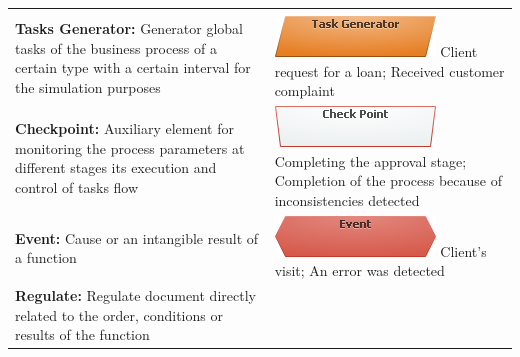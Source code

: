 \documentclass[]{book}
\begin{document}
\begin{longtable}[]{@{}ll@{}}
\begin{minipage}[t]{0.48\columnwidth}
\end{minipage}\tabularnewline
\begin{minipage}[t]{0.46\columnwidth}\raggedright
\textbf{Tasks Generator:} Generator global tasks of the business process of a certain type with a certain interval for the simulation purposes\strut
\end{minipage} & \begin{minipage}[t]{0.48\columnwidth}\raggedright
\includegraphics{images/generator.png} \newline Client request for a loan; Received customer complaint\strut
\end{minipage}\tabularnewline
\begin{minipage}[t]{0.46\columnwidth}\raggedright
\textbf{Checkpoint:} Auxiliary element for monitoring the process parameters at different stages its execution and control of tasks flow\strut
\end{minipage} & \begin{minipage}[t]{0.48\columnwidth}\raggedright
\includegraphics{images/checkpoint.png} \newline Completing the approval stage; Completion of the process because of inconsistencies detected\strut
\end{minipage}\tabularnewline
\begin{minipage}[t]{0.46\columnwidth}\raggedright
\textbf{Event:} Cause or an intangible result of a function\strut
\end{minipage} & \begin{minipage}[t]{0.48\columnwidth}\raggedright
\includegraphics{images/event.png} \newline  Client's visit; An error was detected\strut
\end{minipage}\tabularnewline
\begin{minipage}[t]{0.46\columnwidth}\raggedright
\textbf{Regulate:} Regulate document directly related to the order, conditions or results of the function\strut
\end{minipage} & \begin{minipage}[t]{0.48\columnwidth}\raggedright

\end{minipage}
\end{longtable}
\end{document}
